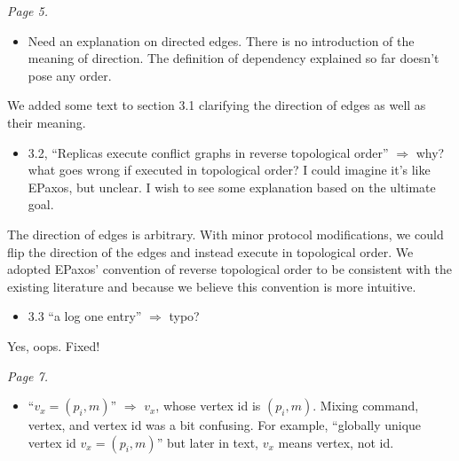 \documentclass[letterpaper,twocolumn,10pt]{article}
\newenvironment{reviewerquote}
{\list{}{\leftmargin=\parindent\rightmargin=0in}\item[] \itshape \color{ReviewerDarkGray}}%
{\endlist}
\begin{document}
\begin{reviewerquote}
  Page 5.

  \begin{itemize}
    \item
      Need an explanation on directed edges. There is no introduction of the
      meaning of direction. The definition of dependency explained so far
      doesn't pose any order.
  \end{itemize}
\end{reviewerquote}

We added some text to section 3.1 clarifying the direction of edges as well as
their meaning.

\begin{reviewerquote}
  \begin{itemize}
    \item
      3.2, ``Replicas execute conflict graphs in reverse topological order''
      $\Rightarrow$ why? what goes wrong if executed in topological order? I
      could imagine it's like EPaxos, but unclear. I wish to see some
      explanation based on the ultimate goal.
  \end{itemize}
\end{reviewerquote}

The direction of edges is arbitrary. With minor protocol modifications, we
could flip the direction of the edges and instead execute in topological order.
We adopted EPaxos' convention of reverse topological order to be consistent
with the existing literature and because we believe this convention is more
intuitive.

\begin{reviewerquote}
  \begin{itemize}
    \item
      3.3 ``a log one entry'' $\Rightarrow$ typo?
  \end{itemize}
\end{reviewerquote}

Yes, oops. Fixed!

\begin{reviewerquote}
  Page 7.

  \begin{itemize}
    \item
      ``$v_x = (p_i, m)$'' $\Rightarrow$ $v_x$, whose vertex id is $(p_i, m)$.
      Mixing command, vertex, and vertex id was a bit confusing. For example,
      ``globally unique vertex id $v_x = (p_i, m)$'' but later in text, $v_x$
      means vertex, not id.
  \end{itemize}
\end{reviewerquote}
\end{document}

